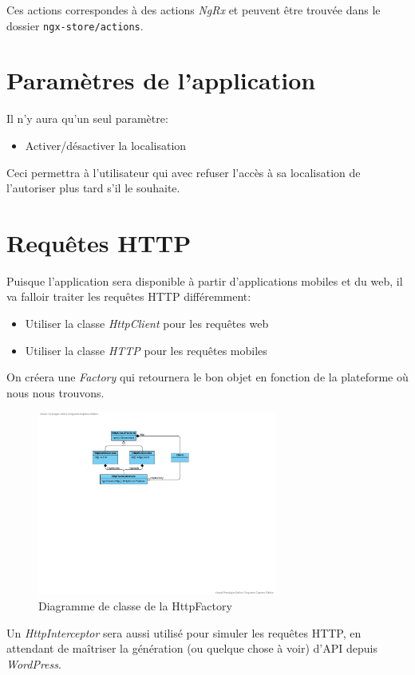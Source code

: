 \documentclass[french]{report}
\begin{document}
Ces actions correspondes à des actions \textit{NgRx} et peuvent être trouvée dans le dossier
\verb|ngx-store/actions|.

\section{Paramètres de l'application}
Il n'y aura qu'un seul paramètre:
\begin{itemize}
    \item Activer/désactiver la localisation
\end{itemize}
Ceci permettra à l'utilisateur qui avec refuser l'accès à sa localisation de
l'autoriser plus tard s'il le souhaite.

\section{Requêtes HTTP}
Puisque l'application sera disponible à partir d'applications mobiles et du web,
il va falloir traiter les requêtes HTTP différemment:
\begin{itemize}
    \item Utiliser la classe \textit{HttpClient} pour les requêtes web
    \item Utiliser la classe \textit{HTTP} pour les requêtes mobiles
\end{itemize}
On créera une \textit{Factory} qui retournera le bon objet en fonction de la
plateforme où nous nous trouvons.

\begin{figure}[H]
    \centering
    \includegraphics[width=0.7\textwidth]{../diags/http_factory_class.pdf}
    \caption{Diagramme de classe de la HttpFactory}
    \label{fig:class_http_factory}
\end{figure}

Un \textit{HttpInterceptor} sera aussi utilisé pour simuler les requêtes HTTP,
en attendant de maîtriser la génération (ou quelque chose à voir) d'API depuis
\textit{WordPress}.
\end{document}
